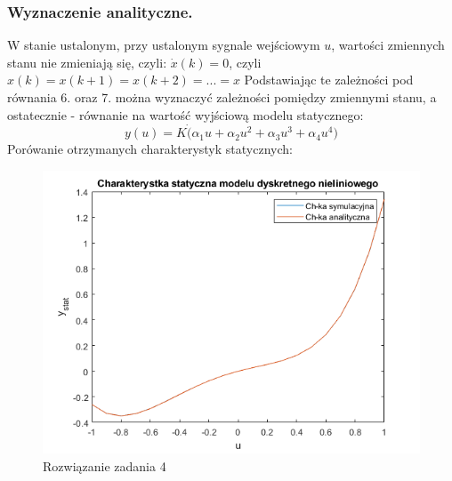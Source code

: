\subsubsection{Wyznaczenie analityczne.}
W stanie ustalonym, przy ustalonym sygnale wejściowym $u$, wartości zmiennych stanu nie zmieniają się, czyli: $\dot{x}(k) = 0$, czyli $x(k)=x(k+1)=x(k+2)=...=x$ Podstawiając te zależności pod równania 6. oraz 7. można wyznaczyć zależności pomiędzy zmiennymi stanu, a ostatecznie - równanie na wartość wyjściową modelu statycznego:
\begin{equation}
y(u)=K \dot (\alpha_{1}u + \alpha_{2}u^2+\alpha_{3}u^3+\alpha_{4}u^4)
\end{equation}
Porówanie otrzymanych charakterystyk statycznych:
\begin{figure}[H]
\centering
\includegraphics[width=15cm]{images/4.png}
\caption{Rozwiązanie zadania 4}
\label{fig:4}
\end{figure}
